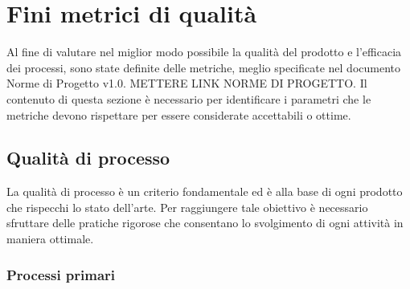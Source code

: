 \section{Fini metrici di qualità}
Al fine di valutare nel miglior modo possibile la qualità del prodotto e l'efficacia dei processi, sono state definite delle metriche, meglio specificate nel documento Norme di Progetto v1.0. METTERE LINK NORME DI PROGETTO. Il contenuto di questa sezione è necessario per identificare i parametri che le metriche devono rispettare per essere considerate accettabili o ottime. 
\subsection{Qualità di processo}
La qualità di processo è un criterio fondamentale ed è alla base di ogni prodotto
che rispecchi lo stato dell'arte. Per raggiungere tale obiettivo è necessario 
sfruttare delle pratiche rigorose che consentano lo svolgimento di ogni attività
in maniera ottimale.
\subsubsection{Processi primari}

